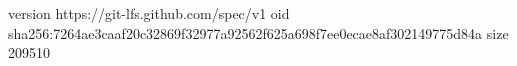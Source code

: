 version https://git-lfs.github.com/spec/v1
oid sha256:7264ae3caaf20c32869f32977a92562f625a698f7ee0ecae8af302149775d84a
size 209510
